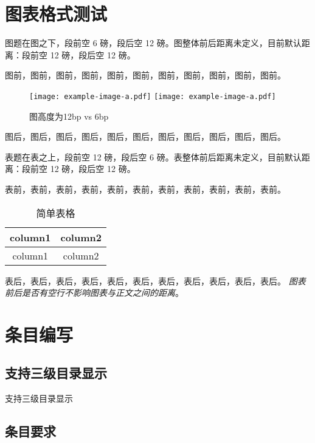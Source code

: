 \newpage
\section{图表格式测试}

图题在图之下，段前空 6 磅，段后空 12 磅。图整体前后距离未定义，目前默认距离：段前空 12 磅，段后空 12 磅。

图前，图前，图前，图前，图前，图前，图前，图前，图前，图前，图前。

\begin{figure}[htbp]
  \centering
  \texttt{[image: example-image-a.pdf]}\hspace*{6bp}
  \texttt{[image: example-image-a.pdf]}
  \caption{图高度为12bp vs 6bp}
\end{figure}

图后，图后，图后，图后，图后，图后，图后，图后，图后，图后，图后。

表题在表之上，段前空 12 磅，段后空 6 磅。表整体前后距离未定义，目前默认距离：段前空 12 磅，段后空 12 磅。

表前，表前，表前，表前，表前，表前，表前，表前，表前，表前，表前。

\begin{table}[htbp]
  \centering
  \caption{简单表格}
    \begin{tabular}{cc}
    \toprule
    column1 & column2\\
    \midrule
    column1 & column2\\
    \bottomrule
    \end{tabular}
  \label{label}
\end{table}

表后，表后，表后，表后，表后，表后，表后，表后，表后，表后，表后。
\emph{图表前后是否有空行不影响图表与正文之间的距离}。


\section{条目编写}

\subsection{支持三级目录显示}

支持三级目录显示


\subsection{条目要求}

